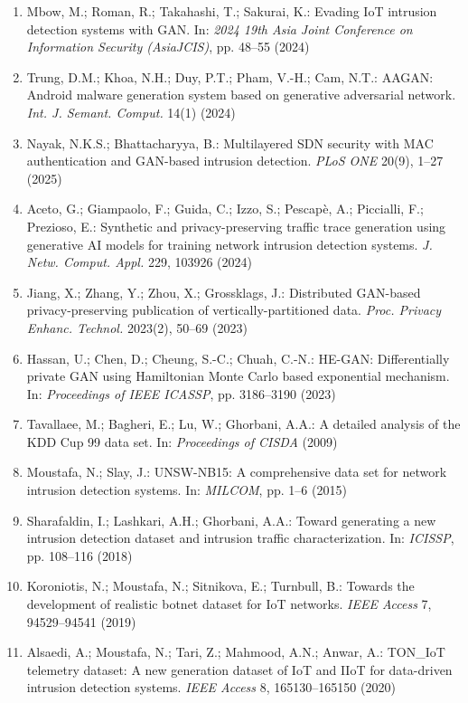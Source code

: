 \documentclass[a4paper]{article}
\begin{document}
\begin{enumerate}[leftmargin=1.2cm, itemsep=1pt, parsep=0pt]
    \item Mbow, M.; Roman, R.; Takahashi, T.; Sakurai, K.: Evading IoT intrusion detection systems with GAN. In: \textit{2024 19th Asia Joint Conference on Information Security (AsiaJCIS)}, pp. 48--55 (2024)
    \item Trung, D.M.; Khoa, N.H.; Duy, P.T.; Pham, V.-H.; Cam, N.T.: AAGAN: Android malware generation system based on generative adversarial network. \textit{Int. J. Semant. Comput.} 14(1) (2024)
    \item Nayak, N.K.S.; Bhattacharyya, B.: Multilayered SDN security with MAC authentication and GAN-based intrusion detection. \textit{PLoS ONE} 20(9), 1--27 (2025)
    \item Aceto, G.; Giampaolo, F.; Guida, C.; Izzo, S.; Pescap\`{e}, A.; Piccialli, F.; Prezioso, E.: Synthetic and privacy-preserving traffic trace generation using generative AI models for training network intrusion detection systems. \textit{J. Netw. Comput. Appl.} 229, 103926 (2024)
    \item Jiang, X.; Zhang, Y.; Zhou, X.; Grossklags, J.: Distributed GAN-based privacy-preserving publication of vertically-partitioned data. \textit{Proc. Privacy Enhanc. Technol.} 2023(2), 50--69 (2023)
    \item Hassan, U.; Chen, D.; Cheung, S.-C.; Chuah, C.-N.: HE-GAN: Differentially private GAN using Hamiltonian Monte Carlo based exponential mechanism. In: \textit{Proceedings of IEEE ICASSP}, pp. 3186--3190 (2023)
    \item Tavallaee, M.; Bagheri, E.; Lu, W.; Ghorbani, A.A.: A detailed analysis of the KDD Cup 99 data set. In: \textit{Proceedings of CISDA} (2009)
    \item Moustafa, N.; Slay, J.: UNSW-NB15: A comprehensive data set for network intrusion detection systems. In: \textit{MILCOM}, pp. 1--6 (2015)
    \item Sharafaldin, I.; Lashkari, A.H.; Ghorbani, A.A.: Toward generating a new intrusion detection dataset and intrusion traffic characterization. In: \textit{ICISSP}, pp. 108--116 (2018)
    \item Koroniotis, N.; Moustafa, N.; Sitnikova, E.; Turnbull, B.: Towards the development of realistic botnet dataset for IoT networks. \textit{IEEE Access} 7, 94529--94541 (2019)
    \item Alsaedi, A.; Moustafa, N.; Tari, Z.; Mahmood, A.N.; Anwar, A.: TON\_IoT telemetry dataset: A new generation dataset of IoT and IIoT for data-driven intrusion detection systems. \textit{IEEE Access} 8, 165130--165150 (2020)

\end{enumerate}
\end{document}
